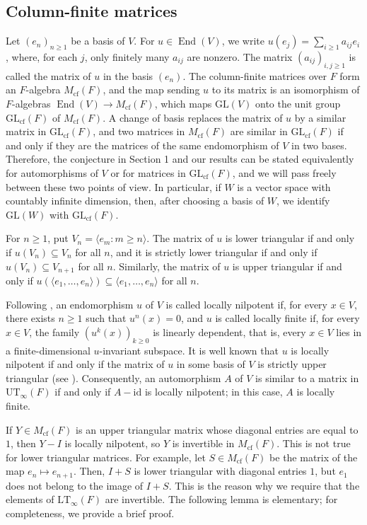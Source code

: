 \documentclass[11pt,reqno,a4paper]{amsart}
\numberwithin{equation}{section}
\theoremstyle{definition}
\theoremstyle{plain}
\newcommand{\cf}{\mathrm{cf}}
\newcommand{\GL}{\mathrm{GL}}
\newcommand{\End}{\operatorname{End}}
\newcommand{\id}{\mathrm{id}}
\newcommand{\LT}{\mathrm{LT}_{\infty}}
\newcommand{\UT}{\mathrm{UT}_{\infty}}
\newcommand{\spann}[1]{\langle #1\rangle}
\begin{document}
\subsection{Column-finite matrices}
Let $(e_n)_{n\ge1}$ be a basis of $V$. For $u\in\End(V)$, we write $u(e_j)=\sum_{i\ge1}a_{ij}e_i$, where, for each $j$, only finitely many $a_{ij}$ are nonzero. The matrix $(a_{ij})_{i,j\ge1}$ is called the matrix of $u$ in the basis $(e_n)$. The column-finite matrices over $F$ form an $F$-algebra $M_{\cf}(F)$, and the map sending $u$ to its matrix is an isomorphism of $F$-algebras $\End(V)\to M_{\cf}(F)$, which maps $\GL(V)$ onto the unit group $\GL_{\cf}(F)$ of $M_{\cf}(F)$. A change of basis replaces the matrix of $u$ by a similar matrix in $\GL_{\cf}(F)$, and two matrices in $M_{\cf}(F)$ are similar in $\GL_{\cf}(F)$ if and only if they are the matrices of the same endomorphism of $V$ in two bases. Therefore, the conjecture in Section 1 and our results can be stated equivalently for automorphisms of $V$ or for matrices in $\GL_{\cf}(F)$, and we will pass freely between these two points of view. In particular, if $W$ is a vector space with countably infinite dimension, then, after choosing a basis of $W$, we identify $\GL(W)$ with $\GL_{\cf}(F)$.

For $n\ge1$, put $V_n=\spann{e_m:m\ge n}$. The matrix of $u$ is lower triangular if and only if $u(V_n)\subseteq V_n$ for all $n$, and it is strictly lower triangular if and only if $u(V_n)\subseteq V_{n+1}$ for all $n$. Similarly, the matrix of $u$ is upper triangular if and only if $u(\spann{e_1,\ldots,e_n})\subseteq\spann{e_1,\ldots,e_n}$ for all $n$.

Following \cite{pazzis2022}, an endomorphism $u$ of $V$ is called locally nilpotent if, for every $x\in V$, there exists $n\ge1$ such that $u^n(x)=0$, and $u$ is called locally finite if, for every $x\in V$, the family $(u^k(x))_{k\ge0}$ is linearly dependent, that is, every $x\in V$ lies in a finite-dimensional $u$-invariant subspace. It is well known that $u$ is locally nilpotent if and only if the matrix of $u$ in some basis of $V$ is strictly upper triangular (see \cite[Section 1.2]{pazzis2022}). Consequently, an automorphism $A$ of $V$ is similar to a matrix in $\UT(F)$ if and only if $A-\id$ is locally nilpotent; in this case, $A$ is locally finite.

If $Y\in M_{\cf}(F)$ is an upper triangular matrix whose diagonal entries are equal to $1$, then $Y-I$ is locally nilpotent, so $Y$ is invertible in $M_{\cf}(F)$. This is not true for lower triangular matrices. For example, let $S\in M_{\cf}(F)$ be the matrix of the map $e_n\mapsto e_{n+1}$. Then, $I+S$ is lower triangular with diagonal entries $1$, but $e_1$ does not belong to the image of $I+S$. This is the reason why we require that the elements of $\LT(F)$ are invertible. The following lemma is elementary; for completeness, we provide a brief proof.
\end{document}
